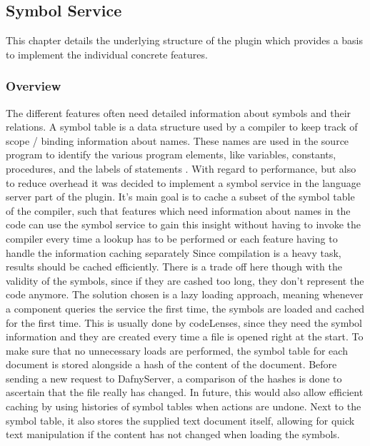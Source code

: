 \subsection{Symbol Service}\label{environment}
This chapter details the underlying structure of the plugin which provides a basis to implement the individual concrete features.
\subsubsection{Overview}\label{symbolservice}
The different features often need detailed information about symbols and their relations. A symbol table is a data structure used by a compiler to keep track of scope / binding information about names. These names are used in the source program to identify the various program elements, like variables, constants, procedures, and the labels of statements \cite[239]{compiler}. \newline
With regard to performance, but also to reduce overhead it was decided to implement a symbol service in the language server part of the plugin. It's main goal is to cache a subset of the symbol table of the compiler, such that features which need information about names in the code can use the symbol service to gain this insight without having to invoke the compiler every time a lookup has to be performed or each feature having to handle the information caching separately \newline
Since compilation is a heavy task, results should be cached efficiently. There is a trade off here though with the validity of the symbols, since if they are cashed too long, they don't represent the code anymore. The solution chosen is a lazy loading approach, meaning whenever a component queries the service the first time, the symbols are loaded and cached for the first time. This is usually done by codeLenses, since they need the symbol information and they are created every time a file is opened right at the start. To make sure that no unnecessary loads are performed, the symbol table for each document is stored alongside a hash of the content of the document. Before sending a new request to DafnyServer, a comparison of the hashes is done to ascertain that the file really has changed. In future, this would also allow efficient caching by using histories of symbol tables when actions are undone. Next to the symbol table, it also stores the supplied text document itself, allowing for quick text manipulation if the content has not changed when loading the symbols.\newline
